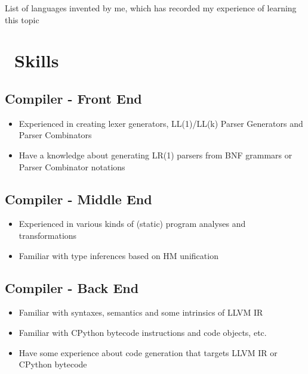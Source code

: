 \documentclass{resume}
\begin{document}
List of languages invented by me, which has recorded my experience of learning this topic


\section{\faCogs\ Skills}

\subsection{\textbf{Compiler - Front End}}
\begin{itemize}
  \item Experienced in creating lexer generators, LL(1)/LL(k) Parser Generators and Parser Combinators
  \item Have a knowledge about generating LR(1) parsers from BNF grammars or Parser Combinator notations
\end{itemize}

\subsection{\textbf{Compiler - Middle End}}
\begin{itemize}
  \item Experienced in various kinds of (static) program analyses and transformations
  \item Familiar with type inferences based on HM unification
\end{itemize}

\subsection{\textbf{Compiler - Back End}}
\begin{itemize}
  \item Familiar with syntaxes, semantics and some intrinsics of LLVM IR
  \item Familiar with CPython bytecode instructions and code objects, etc.
  \item Have some experience about code generation that targets LLVM IR or CPython bytecode
\end{itemize}
\end{document}

